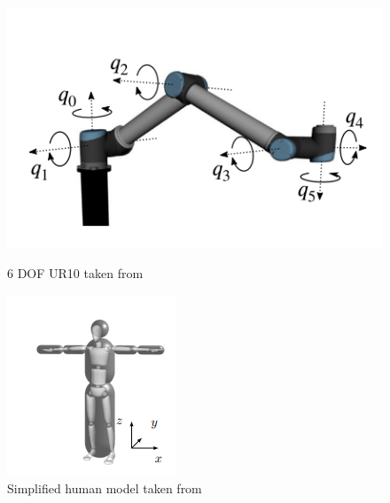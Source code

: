 \begin{figure}[!htbp]
    \centering
    \begin{minipage}[b]{0.40\columnwidth}
        \includegraphics[width=\textwidth]{images/ur10.png}
        \caption{6 DOF UR10 taken from \parencite{max}}
        \label{fig:ur10}
    \end{minipage}
    \begin{minipage}[b]{0.40\columnwidth}
        \includegraphics[width=\textwidth]{images/reduced body.png}
        \caption{Simplified human model taken from \parencite{renz1}} 
        \label{fig:reduced}
    \end{minipage}
\end{figure}

